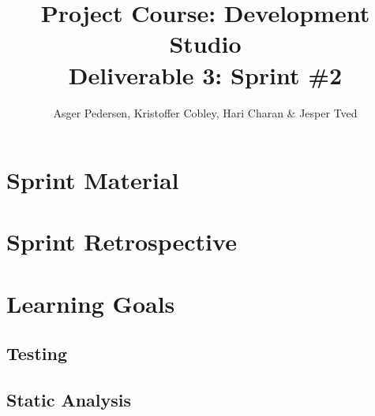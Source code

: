 \documentclass[]{article}
\title{ Project Course: Development Studio \\ Deliverable 3: Sprint \#2}
\author{ Asger Pedersen, Kristoffer Cobley, Hari Charan \& Jesper Tved }
\begin{document}
\ifpdf
{}
\else
{}
\fi

\maketitle
\setcounter{tocdepth}{1}
\tableofcontents
\newpage
\section{Sprint Material} %
\label{sec:Sprint Material}

\section{Sprint Retrospective} %
\label{sec:Sprint Retrospective}

\section{Learning Goals} %
\label{sec:Learning Goals}
\subsection{Testing} %
\label{sub:Testing}

\subsection{Static Analysis} %
\label{sub:Static Analysis}



\end{document}
